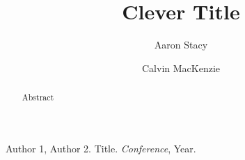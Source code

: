 \documentclass[11pt,onecolumn]{article}
\begin{document}
\title{Clever Title}

\author{
 Aaron Stacy \\ \and
 Calvin MacKenzie \\
}

\maketitle

\begin{abstract}
Abstract
\end{abstract}










\begin{thebibliography}{1}
\small

Author 1, Author 2. Title. \emph{Conference}, Year.

\end{thebibliography}
\end{document}
